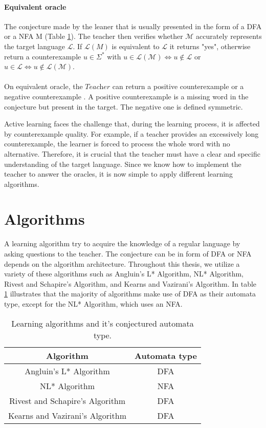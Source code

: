 \paragraph*{Equivalent oracle} 
The conjecture made by the leaner that is usually presented in the form of a DFA or a NFA M (Table \ref{table:conjecire_type}).
The teacher then verifies whether $\mathcal{M}$ accurately represents the target language $\mathcal{L}$.
If $\mathcal{L}(M)$ is equivalent to $\mathcal{L}$ it returns "yes", otherwise return a counterexample $u \in \Sigma^{*}$ with 
$u \in \mathcal{L}(\mathcal{M}) \Longleftrightarrow u \notin \mathcal{L}$ or 
$u \in \mathcal{L} \Longleftrightarrow u \notin \mathcal{L}(\mathcal{M})$.
\paragraph*{}
On equivalent oracle, the $\textit{Teacher}$ can return a positive counterexample or a negative counterexample \cite{chen2017learning}.
A positive counterexample is a missing word in the conjecture but present in the target.
The negative one is defined symmetric.

Active learning faces the challenge that, during the learning process, it is 
affected by counterexample quality.
For example, if a teacher provides an excessively long counterexample, the learner is forced to process the whole word with no alternative.
Therefore, it is crucial that the teacher must have a clear and specific understanding of the 
target language.
Since we know how to implement the teacher to answer the oracles, it is now simple 
to apply different learning algorithms.
\section{Algorithms}\label{section:learner_learning}
A learning algorithm try to acquire the knowledge of a regular language by asking questions to the teacher.
The conjecture can be in form of DFA or NFA depends on the algorithm architecture.
Throughout this thesis, we utilize a variety of these algorithms such as Angluin’s L* Algorithm, NL* Algorithm,
Rivest and Schapire’s Algorithm, and Kearns and Vazirani’s Algorithm.
In table \ref{table:conjecire_type} illustrates that the majority of algorithms make use of DFA as their automata type, except for the NL* Algorithm, which uses an NFA.
\begin{table}[h!]
  \begin{center}
    \begin{tabular}{ c|c } 
     \hline
     Algorithm & Automata type \\
     \hline
     Angluin’s L* Algorithm & DFA \\
     NL* Algorithm & NFA \\
     Rivest and Schapire’s Algorithm & DFA \\
     Kearns and Vazirani’s Algorithm & DFA \\
     \hline
    \end{tabular}
  \end{center}
  \caption{Learning algorithms and it's conjectured automata type.}
  \label{table:conjecire_type}
\end{table}

